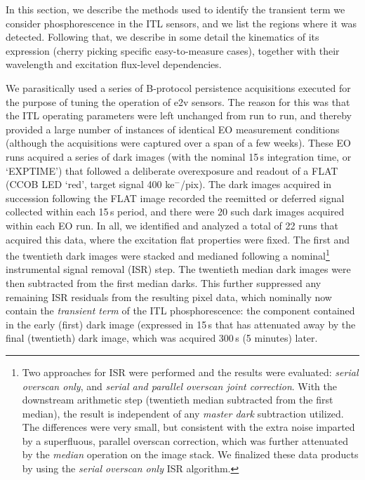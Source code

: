 In this section, we describe the methods used to identify the transient term we consider phosphorescence in the ITL sensors, and we list the regions where it was detected. Following that, we describe in some detail the kinematics of its expression (cherry picking specific easy-to-measure cases), together with their wavelength and excitation flux-level dependencies.

We parasitically used a series of B-protocol persistence acquisitions executed for the purpose of tuning the operation of e2v sensors. The reason for this was that the ITL operating parameters were left unchanged from run to run, and thereby provided a large number of instances of identical EO measurement conditions (although the acquisitions were captured over a span of a few weeks). These EO runs acquired a series of dark images (with the nominal 15\,s integration time, or `EXPTIME') that followed a deliberate overexposure and readout of a FLAT (CCOB LED `red', target signal 400 ke$^-$/pix). The dark images acquired in succession following the FLAT image recorded the reemitted or deferred signal collected within each 15\,s period, and there were 20 such dark images acquired within each EO run. In all, we identified and analyzed a total of 22 runs that acquired this data, where the excitation flat properties were fixed. The first and the twentieth dark images were stacked and medianed following a nominal\footnote{Two approaches for ISR were performed and the results were evaluated: {\it serial overscan only}, and {\it serial and parallel overscan joint correction}. With the downstream arithmetic step (twentieth median subtracted from the first median), the result is independent of any {\it master dark} subtraction utilized. The differences were very small, but consistent with the extra noise imparted by a superfluous, parallel overscan correction, which was further attenuated by the {\it median} operation on the image stack. We finalized these data products by using the {\it serial overscan only} ISR algorithm.} instrumental signal removal (ISR) step. The twentieth median dark images were then subtracted from the first median darks. This further suppressed any remaining ISR residuals from the resulting pixel data, which nominally now contain the {\it transient term} of the ITL phosphorescence: the component contained in the early (first) dark image (expressed in 15\,s that has attenuated away by the final (twentieth) dark image, which was acquired 300\,s (5 minutes) later.

\clearpage

